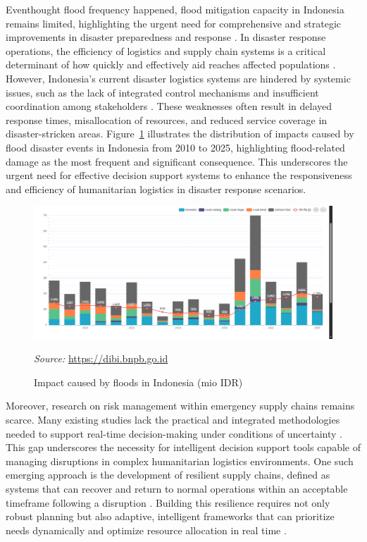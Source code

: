 \documentclass[conference,final,a4paper,twoside,10pt]{IEEEtran}
\begin{document}
Eventhought flood frequency happened, flood mitigation capacity in Indonesia remains limited, highlighting the urgent need for comprehensive and strategic improvements in disaster preparedness and response \cite{riza2020advancing}.
In disaster response operations, the efficiency of logistics and supply chain systems is a critical determinant of how quickly and effectively aid reaches affected populations \cite{ma2022critical}. However, Indonesia's current disaster logistics systems are hindered by systemic issues, such as the lack of integrated control mechanisms and insufficient coordination among stakeholders \cite{rustian2021implementation}. These weaknesses often result in delayed response times, misallocation of resources, and reduced service coverage in disaster-stricken areas. Figure~\ref{fig:floodimpact} illustrates the distribution of impacts caused by flood disaster events in Indonesia from 2010 to 2025, highlighting flood-related damage as the most frequent and significant consequence. This underscores the urgent need for effective decision support systems to enhance the responsiveness and efficiency of humanitarian logistics in disaster response scenarios.

\begin{figure}[htbp]
    \centerline{\includegraphics[width=0.8\linewidth]{fig2.png}}
    \caption{Impact caused by floods in Indonesia (mio IDR)}
    \label{fig:floodimpact}
    \vspace{0.2cm}
\footnotesize{\textit{Source:} \url{https://dibi.bnpb.go.id}}
\end{figure}

Moreover, research on risk management within emergency supply chains remains scarce. Many existing studies lack the practical and integrated methodologies needed to support real-time decision-making under conditions of uncertainty \cite{chukwuka2023comprehensive}. This gap underscores the necessity for intelligent decision support tools capable of managing disruptions in complex humanitarian logistics environments.
One such emerging approach is the development of resilient supply chains, defined as systems that can recover and return to normal operations within an acceptable timeframe following a disruption \cite{orengo2022food}. Building this resilience requires not only robust planning but also adaptive, intelligent frameworks that can prioritize needs dynamically and optimize resource allocation in real time \cite{ramirez2020sustainability}.
\end{document}
